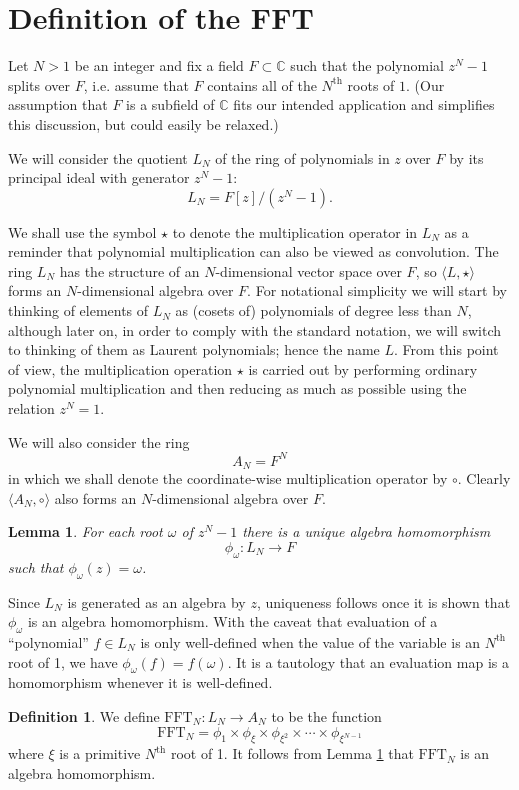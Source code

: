 \documentclass[12pt, letterpaper, oneside]{amsart}
\theoremstyle{definition}
\newtheorem{definition}[para]{Definition}
\theoremstyle{plain}
\newtheorem{lemma}[para]{Lemma}
\numberwithin{equation}{para}
\numberwithin{figure}{section}
\newcommand{\CC}{\mathbb{C}}
\newcommand{\FFT}{\text{FFT}}
\renewcommand{\th}{\text{th}}
\begin{document}
\section{Definition of the FFT}
Let $N > 1$ be an integer and fix a field $F\subset\CC$ such that the polynomial
$z^N - 1$ splits over $F$, i.e. assume that $F$ contains all of the $N^\th$
roots of $1$.  (Our assumption that $F$ is a subfield of $\CC$ fits our intended
application and simplifies this discussion, but could easily be relaxed.)

We will consider the quotient $L_N$ of the ring of polynomials in $z$ over $F$
by its principal ideal with generator $z^N - 1$:
$$L_N = F[z]/(z^N-1).$$

We shall use the symbol $\star$ to denote the multiplication operator in $L_N$
as a reminder that polynomial multiplication can also be viewed as convolution.
The ring $L_N$ has the structure of an $N$-dimensional vector space over $F$, so
$\langle L, \star\rangle$ forms an $N$-dimensional algebra over $F$.  For
notational simplicity we will start by thinking of elements of $L_N$ as (cosets
of) polynomials of degree less than $N$, although later on, in order to comply
with the standard notation, we will switch to thinking of them as Laurent
polynomials; hence the name $L$.  From this point of view, the multiplication
operation $\star$ is carried out by performing ordinary polynomial
multiplication and then reducing as much as possible using the relation
$z^N = 1$.

We will also consider the ring $$A_N = F^N$$ in which we shall denote the
coordinate-wise multiplication operator by $\circ$.  Clearly
$\langle A_N, \circ\rangle$ also forms an $N$-dimensional algebra over $F$.

\begin{lemma}\label{lemma:evaluation}
For each root $\omega$ of $z^N - 1$ there is a unique algebra
homomorphism
$$\phi_\omega:L_N \to F$$
such that $\phi_\omega(z) = \omega$.
\end{lemma}
\proof Since $L_N$ is generated as an algebra by $z$, uniqueness
follows once it is shown that $\phi_\omega$ is an algebra
homomorphism.  With the caveat that evaluation of a ``polynomial''
$f\in L_N$ is only well-defined when the value of the variable is an
$N^\th$ root of 1, we have $\phi_\omega(f) = f(\omega)$.  It is a
tautology that an evaluation map is a homomorphism whenever it is
well-defined.
\endproof

\begin{definition}\label{definition:fft}
We define $\FFT_N:L_N \to A_N$ to be the function
$$\FFT_N = \phi_1 \times \phi_\xi \times \phi_{\xi^2} \times \cdots
\times \phi_{\xi^{N-1}}$$
where $\xi$ is a primitive $N^\th$ root of 1.  It follows from
Lemma \ref{lemma:evaluation} that $\FFT_N$ is an algebra homomorphism.
\end{definition}
\end{document}
